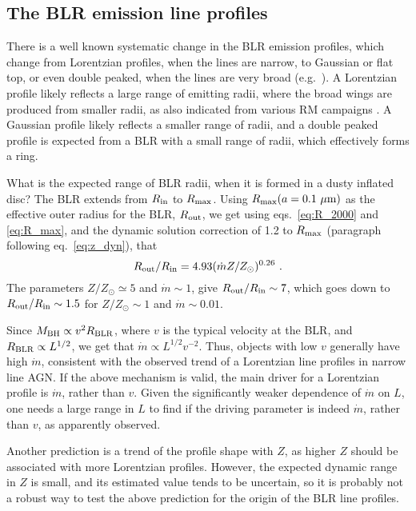 \documentclass[a4paper,fleqn,usenatbib]{mnras}
\newcommand{\mic}{\mbox{$\mu$m}}
\begin{document}
\subsection{The BLR emission line profiles}

There is a well known systematic change in the BLR emission profiles, which change from 
Lorentzian profiles, when the lines are narrow, to Gaussian or flat top, or even double peaked, 
when the lines are very broad (e.g.\ \citealt{Collin06, Kolla13}). A Lorentzian profile likely 
reflects a large
range of emitting radii, where the broad wings are produced from smaller radii, as also
indicated from various RM campaigns \citep{Pancoast14}. A Gaussian profile likely reflects
a smaller range of radii, and a double peaked profile is expected from a BLR with a small
range of radii, which effectively forms a ring. 

What is the expected range of BLR radii, when it is formed in a dusty inflated disc? 
The BLR extends from $R_{\rm in}$ to $R_{\rm max}$. Using 
$R_{\rm max}(a=0.1~\mic)$ as the effective outer radius for the BLR, $R_{\rm out}$, we get
using eqs.~\ref{eq:R_2000} and \ref{eq:R_max}, and the dynamic solution correction of 1.2 to $R_{\rm max}$
(paragraph following eq.~\ref{eq:z_dyn}), that 
\begin{equation} 
R_{\rm out}/R_{\rm in}=4.93(\dot{m}Z/Z_{\odot})^{0.26}\ .
\end{equation} 
The parameters $Z/Z_{\odot}\simeq 5$ and $\dot{m}\sim 1$, give $R_{\rm out}/R_{\rm in}\sim 7$,
which goes down to $R_{\rm out}/R_{\rm in}\sim 1.5$ for $Z/Z_{\odot}\sim 1$ and $\dot{m}\sim 0.01$. 

Since $M_{\rm BH}\propto v^2R_{\rm  BLR}$, where $v$ is the typical velocity at the BLR,
and $R_{\rm  BLR}\propto L^{1/2}$, we get that $\dot{m}\propto L^{1/2}v^{-2}$. Thus, objects with low $v$
generally have high $\dot{m}$, consistent with the observed trend of a Lorentzian line profiles
in narrow line AGN. If the above mechanism is valid, the main driver for a Lorentzian profile is
$\dot{m}$, rather than $v$. Given the significantly weaker dependence of $\dot{m}$ on 
$L$, one needs a large range in $L$ to find if the driving parameter is indeed $\dot{m}$,
rather than $v$, as apparently observed. 

Another prediction is a trend of the profile shape with $Z$, as
higher $Z$ should be associated with more Lorentzian profiles. However, the expected dynamic
range in $Z$ is small, and its estimated value tends to be uncertain, so it is probably not a
robust way to test the above prediction for the origin of the BLR line profiles.
\end{document}
